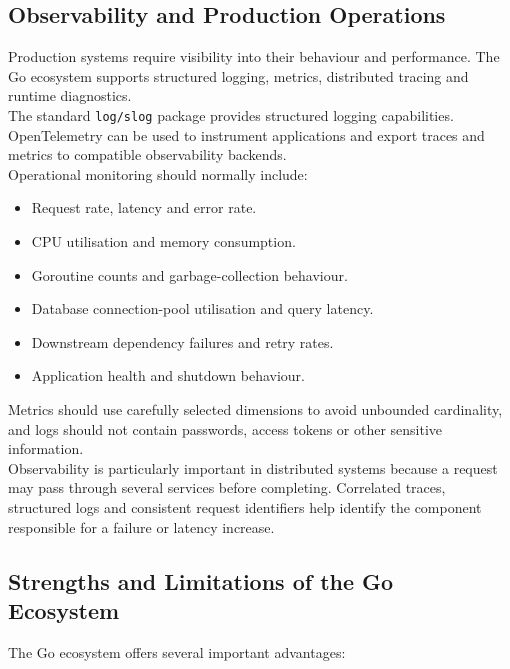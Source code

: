 \subsection{Observability and Production Operations}

Production systems require visibility into their behaviour and performance. The Go ecosystem supports structured logging, metrics, distributed tracing and runtime diagnostics.\\

The standard \texttt{log/slog} package provides structured logging capabilities. OpenTelemetry can be used to instrument applications and export traces and metrics to compatible observability backends.\\

Operational monitoring should normally include:

\begin{itemize}
    \item Request rate, latency and error rate.
    \item CPU utilisation and memory consumption.
    \item Goroutine counts and garbage-collection behaviour.
    \item Database connection-pool utilisation and query latency.
    \item Downstream dependency failures and retry rates.
    \item Application health and shutdown behaviour.
\end{itemize}

Metrics should use carefully selected dimensions to avoid unbounded cardinality, and logs should not contain passwords, access tokens or other sensitive information.\\

Observability is particularly important in distributed systems because a request may pass through several services before completing. Correlated traces, structured logs and consistent request identifiers help identify the component responsible for a failure or latency increase.

\subsection{Strengths and Limitations of the Go Ecosystem}

The Go ecosystem offers several important advantages:

